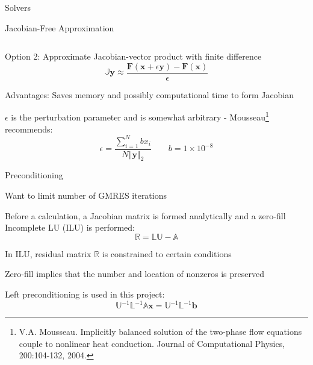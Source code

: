 \documentclass{beamer}
\begin{document}
\begin{section}{Solvers}
\begin{frame}{Jacobian-Free Approximation}
\begin{customlist}{2ex}{0pt}
\[  \]
  \vfill\item Option 2: Approximate Jacobian-vector product with finite difference
  \[
   \mathbb{J}\mathbf{y}\approx\frac{\mathbf{F}\left(\mathbf{x}+\epsilon\mathbf{y}\right)-\mathbf{F}\left(\mathbf{x}\right)}{\epsilon}
  \]
  \vfill\item Advantages: Saves memory and possibly computational time to form Jacobian
  \vfill\item $\epsilon$ is the perturbation parameter and is somewhat arbitrary - Mousseau\footnote{V.A. Mousseau. Implicitly balanced solution of the two-phase flow equations couple to nonlinear heat
    conduction. Journal of Computational Physics, 200:104-132, 2004.} recommends:
  \[
   \epsilon=\frac{\sum_{i=1}^{N}bx_{i}}{N\left\Vert \mathbf{y}\right\Vert _{2}}\qquad b=1\times10^{-8}
  \]
\end{customlist}
\end{frame}
\begin{frame}{Preconditioning}
\begin{customlist}{2ex}{0pt}
  \item Want to limit number of GMRES iterations
  \vfill\item Before a calculation, a Jacobian matrix is formed analytically and a zero-fill Incomplete LU (ILU) is performed:
  \[
   \mathbb{R}=\mathbb{L}\mathbb{U}-\mathbb{A}
  \]
  \vfill\item In ILU, residual matrix $\mathbb{R}$ is constrained to certain conditions
  \vfill\item Zero-fill implies that the number and location of nonzeros is preserved
  \vfill\item Left preconditioning is used in this project:
  \[
   \mathbb{U}^{-1}\mathbb{L}^{-1}\mathbb{A}\mathbf{x}=\mathbb{U}^{-1}\mathbb{L}^{-1}\mathbf{b}
  \]
\end{customlist}
\end{frame}
\end{section}
\end{document}
